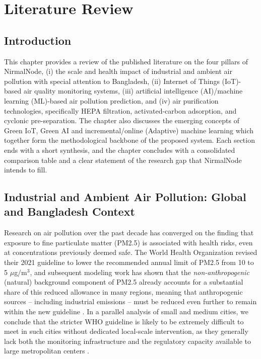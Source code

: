 \chapter{Literature Review}
\label{ch:literature-review}

\section{Introduction}
\label{sec:lr-intro}

This chapter provides a review of the published literature on the four pillars of NirmalNode, (i) the scale and health impact of industrial and ambient air pollution with special attention to Bangladesh, (ii) Internet of Things (IoT)-based air quality monitoring systems, (iii) artificial intelligence (AI)/machine learning (ML)-based air pollution prediction, and (iv) air purification technologies, specifically HEPA filtration, activated-carbon adsorption, and cyclonic pre-separation. The chapter also discusses the emerging concepts of Green IoT, Green AI and incremental/online (Adaptive) machine learning which together form the methodological backbone of the proposed system. Each section ends with a short synthesis, and the chapter concludes with a consolidated comparison table and a clear statement of the research gap that NirmalNode intends to fill.

\section{Industrial and Ambient Air Pollution: Global and Bangladesh Context}
\label{sec:lr-pollution-context}

Research on air pollution over the past decade has converged on the finding that exposure to fine particulate matter (PM2.5) is associated with health risks, even at concentrations previously deemed safe. The World Health Organization revised their 2021 guideline to lower the recommended annual limit of PM2.5 from 10 to 5 $\mu$g/m$^3$, and subsequent modeling work has shown that the \emph{non-anthropogenic} (natural) background component of PM2.5 already accounts for a substantial share of this reduced allowance in many regions, meaning that anthropogenic sources -- including industrial emissions -- must be reduced even further to remain within the new guideline \citep{pai2022who}. In a parallel analysis of small and medium cities, we conclude that the stricter WHO guideline is likely to be extremely difficult to meet in such cities without dedicated local-scale intervention, as they generally lack both the monitoring infrastructure and the regulatory capacity available to large metropolitan centers \citep{polezer2023new}.

